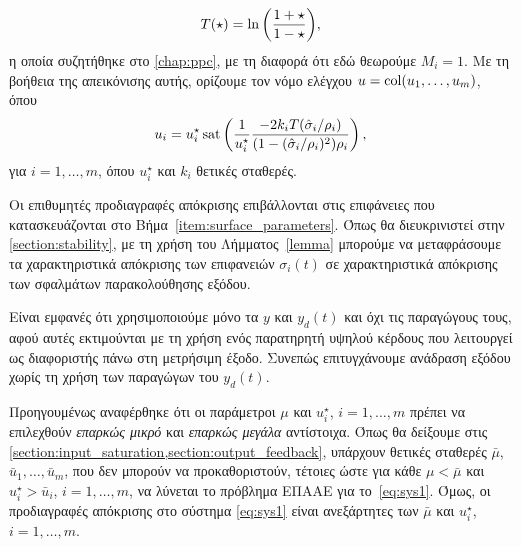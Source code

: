 \begin{enumerate}[label=\Roman*., ref=\Roman*]
        \[
            T(\star) = \ln \pqty{\frac{1+\star}{1-\star}},
        \]
        η οποία συζητήθηκε στο \cref{chap:ppc}, με τη διαφορά ότι εδώ θεωρούμε $M_i = 1$. Με τη βοήθεια της απεικόνισης αυτής, ορίζουμε τον νόμο ελέγχου $u = \operatorname{col}(u_1, \ldots, u_m)$, όπου
        \begin{equation}
            \label{eq:control_law}
            u_i = u_i^\star \operatorname{sat}\left(\frac{1}{u_i^\star} 
            \frac{ -2 k_i T(\hat \sigma_i/ \rho_i)}
            {(1 - (\hat \sigma_i/ \rho_i)^2)\rho_i} \right),
        \end{equation}
        για $i = 1, \ldots, m$, όπου $u_i^\star$ και $k_i$ θετικές σταθερές.
\end{enumerate}

\begin{remark}
    \label{remark:manifold}
    Οι επιθυμητές προδιαγραφές απόκρισης επιβάλλονται στις επιφάνειες που κατασκευάζονται στο Βήμα~\ref{item:surface_parameters}. Όπως θα διευκρινιστεί στην \cref{section:stability}, με τη χρήση του Λήμματος~\ref{lemma} μπορούμε να μεταφράσουμε τα χαρακτηριστικά απόκρισης των επιφανειών $\sigma_i(t)$ σε χαρακτηριστικά απόκρισης των σφαλμάτων παρακολούθησης εξόδου.
\end{remark}

\begin{remark}
    Είναι εμφανές ότι χρησιμοποιούμε μόνο τα $y$ και $y_d(t)$ και όχι τις παραγώγους τους, αφού αυτές εκτιμούνται με τη χρήση ενός παρατηρητή υψηλού κέρδους που λειτουργεί ως διαφοριστής πάνω στη μετρήσιμη έξοδο. Συνεπώς επιτυγχάνουμε ανάδραση εξόδου χωρίς τη χρήση των παραγώγων του $y_d(t)$.
\end{remark}

\begin{remark}
    \label{remark:appropriately}
    Προηγουμένως αναφέρθηκε ότι οι παράμετροι $\mu$ και $u_i^\star$, $i = 1, \ldots, m$ πρέπει να επιλεχθούν \emph{επαρκώς μικρό} και \emph{επαρκώς μεγάλα} αντίστοιχα. Όπως θα δείξουμε στις  \cref{section:input_saturation,section:output_feedback}, υπάρχουν θετικές σταθερές $\bar \mu$, $\bar u_1, \ldots, \bar u_m$, που δεν μπορούν να προκαθοριστούν, τέτοιες ώστε για κάθε $\mu < \bar \mu$ και $u_i^\star > \bar u_i$, $i = 1,\ldots, m$, να λύνεται το πρόβλημα ΕΠΑΑΕ για το~\eqref{eq:sys1}. Όμως, οι προδιαγραφές απόκρισης στο σύστημα \cref{eq:sys1} είναι ανεξάρτητες των $\bar \mu$ και $u_i^\star$, $i = 1, \ldots, m$.
\end{remark}

